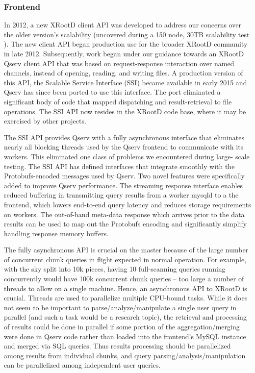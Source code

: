 \documentclass[DM,lsstdraft,toc]{lsstdoc}
\begin{document}
\subsubsection{Frontend}\label{frontend}

In 2012, a new XRootD client API was developed to address our concerns over
the older version's scalability (uncovered during a 150 node, 30TB scalability
test ). The new client API began production use for the
broader XRootD community in late 2012. Subsequently, work began under our
guidance towards an XRootD Qserv client API that was based on request-response
interaction over named channels, instead of opening, reading, and writing
files. A production version of this API, the Scalable Service Interface (SSI)
became available in early 2015 and Qserv has since been ported to use this
interface. The port eliminated a significant body of code that mapped
dispatching and result-retrieval to file operations. The SSI API now resides
in the XRootD code base, where it may be exercised by other projects.

The SSI API provides Qserv with a fully asynchronous interface that eliminates
nearly all blocking threads used by the Qserv frontend to communicate with its
workers. This eliminated one class of problems we encountered during large-
scale testing. The SSI API has defined interfaces that integrate smoothly with
the Protobufs-encoded messages used by Qserv. Two novel features were
specifically added to improve Qserv performance. The streaming response
interface enables reduced buffering in transmitting query results from a
worker mysqld to a the frontend, which lowers end-to-end query latency and
reduces storage requirements on workers. The out-of-band meta-data response
which arrives prior to the data results can be used to map out the Protobufs
encoding and significantly simplify handling response memory buffers.

The fully asynchronous API is crucial on the master because of the large
number of concurrent chunk queries in flight expected in normal operation. For
example, with the sky split into 10k pieces, having 10 full-scanning queries
running concurrently would have 100k concurrent chunk queries -- too large a
number of threads to allow on a single machine. Hence, an asynchronous API to
XRootD is crucial. Threads are used to parallelize multiple CPU-bound tasks.
While it does not seem to be important to parse/analyze/manipulate a single
user query in parallel (and such a task would be a research topic), the
retrieval and processing of results could be done in parallel if some portion
of the aggregation/merging were done in Qserv code rather than loaded into the
frontend's MySQL instance and merged via SQL queries. Thus results processing
should be parallelized among results from individual chunks, and query
parsing/analysis/manipulation can be parallelized among independent user
queries.
\end{document}
